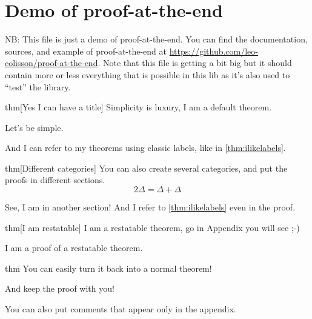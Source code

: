 \documentclass{article}
\begin{document}
\section{Demo of proof-at-the-end}

NB: This file is just a demo of proof-at-the-end.  You can find the documentation, sources, and example of proof-at-the-end at \url{https://github.com/leo-colisson/proof-at-the-end}. Note that this file is getting a bit big but it should contain more or less everything that is possible in this lib as it's also used to ``test'' the library.

\begin{theoremEnd}{thm}[Yes I can have a title]
  \label{thm:ilikelabels}
  Simplicity is luxury, I am a default theorem.
\end{theoremEnd}
\begin{proofEnd}
  Let's be simple.  
\end{proofEnd}

And I can refer to my theorems using classic labels, like in \autoref{thm:ilikelabels}.

\begin{theoremEnd}[category=greattheorem, end]{thm}[Different categories]
  You can also create several categories, and put the proofs in different sections.
  \[2\Delta = \Delta + \Delta\]
\end{theoremEnd}
\begin{proofEnd}
  See, I am in another section! And I refer to \autoref{thm:ilikelabels} even in the proof.
\end{proofEnd}

\begin{theoremEnd}[restate]{thm}[I am restatable]
  I am a restatable theorem, go in Appendix you will see ;-)
\end{theoremEnd}
\begin{proofEnd}
  I am a proof of a restatable theorem.  
\end{proofEnd}


\begin{theoremEnd}[normal]{thm}
  You can easily turn it back into a normal theorem!
\end{theoremEnd}
\begin{proofEnd}
  And keep the proof with you!  
\end{proofEnd}

You can also put comments that appear only in the appendix.
\end{document}
